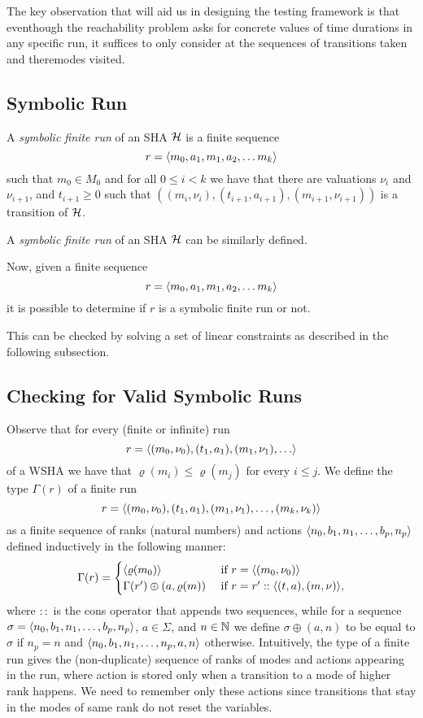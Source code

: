 The key observation that will aid us in designing the
testing framework is that eventhough the reachability problem asks
for concrete values of time durations in any specific run,
it suffices to only consider at the sequences of transitions taken and theremodes visited.

\subsection{Symbolic Run}
A \emph{symbolic finite run} of an SHA $\mathcal{H}$ is a finite sequence 
 \[
 r = \langle m_0, a_1, m_1, a_2, \ldots m_k \rangle
 \] 
 such that $m_0 \in M_0$ and for all $0 \leq i < k$ we have
 that there are valuations $\nu_i$ and $\nu_{i+1}$, and $t_{i+1} \geq 0$ such that
 $((m_i, \nu_i), (t_{i+1}, a_{i+1}), (m_{i+1}, \nu_{i+1}))$ is a transition
 of $\mathcal{H}$.

A \emph{symbolic finite run} of an SHA $\mathcal{H}$ can be similarly defined.

Now, given a finite sequence
\[
 r = \langle m_0, a_1, m_1, a_2, \ldots m_k \rangle
 \] 
it is possible to determine if $r$ is a symbolic finite run or not.

This can be checked by solving a set of linear constraints as described in the following subsection.

\subsection{Checking for Valid Symbolic Runs}
 
Observe that for every (finite or infinite) run 
\[
  r = \langle (m_0, \nu_0), (t_1, a_1), (m_1, \nu_1), \ldots \rangle
\]
of a WSHA we have
that $\varrho(m_i) \leq \varrho(m_j)$ for every $i \leq j$.
We define the type $\Gamma(r)$ of a finite run 
\[
r = \langle (m_0, \nu_0), (t_1, a_1), (m_1, \nu_1), \ldots, (m_k, \nu_k) \rangle
\]
as a finite sequence of ranks (natural numbers) and actions  
$\langle n_0, b_1,  n_1,\ldots, b_p, n_p \rangle$ defined inductively in the following manner: 
\begin{eqnarray*}
  \Gamma(r) = 
\begin{cases}
  \langle \varrho(m_0) \rangle & \text{ if $r = \langle (m_0, \nu_0) \rangle$}\\
  \Gamma(r') \oplus (a, \varrho(m)) & \text{ if $r = r'::\langle (t, a), (m, \nu) \rangle$},
\end{cases}
\end{eqnarray*}  
where $::$ is the cons operator that appends two sequences, while 
for a sequence $\sigma = \langle n_0, b_1, n_1, \ldots, b_p, n_p \rangle$, $a \in \Sigma$, and $n \in
\mathbb N$ we define $\sigma \oplus (a, n)$ to be equal to $\sigma$ if $n_p = n$ and
$\langle n_0, b_1, n_1, \ldots, n_p, a, n \rangle$ otherwise.
Intuitively, the type of a finite run gives the (non-duplicate) sequence of
ranks of modes and actions appearing in the run, where action is stored only
when a transition to a mode of higher rank happens. 
We need to remember only these actions since transitions that stay in the modes
of same rank do not reset the variables. 

